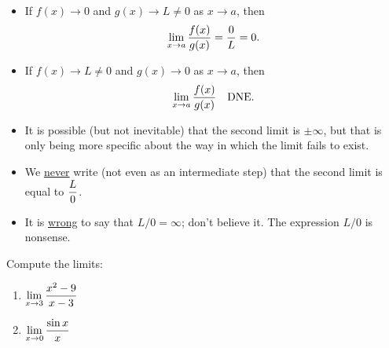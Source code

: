 \setcounter{chapter}{7}
\setcounter{section}{5}
\setcounter{theorem}{0}
\setcounter{equation}{0}


\begin{remark}\,
\begin{itemize}
\item If $f(x)\to 0$ and $g(x)\to L\ne 0$ as $x\to a$, then 
\begin{equation*}
\displaystyle\lim_{x\to a}\frac{f(x)}{g(x)} = \frac{0}{L} = 0.
\end{equation*}
\item If $f(x)\to L\ne 0$ and $g(x)\to 0$ as $x\to a$, then 
\begin{equation*}
\displaystyle\lim_{x\to a}\frac{f(x)}{g(x)} \quad \mathrm{DNE}.
\end{equation*}
\item It is possible (but not inevitable) that the second limit is $\pm\infty$, but that is only being more specific about the way in which the limit fails to exist.
\item We \underline{never} write (not even as an intermediate step) that the second limit is equal to $\displaystyle\frac{L}{0}$.
\item It is \underline{wrong} to say that $L/0 = \infty$; don't believe it.
The expression $L/0$ is nonsense.
\end{itemize}
\end{remark}

\begin{example}
Compute the limits:
\begin{enumerate}
\item $\displaystyle\lim_{x\to 3}\frac{x^2-9}{x-3}$
\ifdefined\SOLUTION
{}
\else
\fi
\vfill

\item $\displaystyle\lim_{x\to 0}\frac{\sin x}{x}$
\ifdefined\SOLUTION
{}
\else
\fi
\vfill
\end{enumerate}
\end{example}

